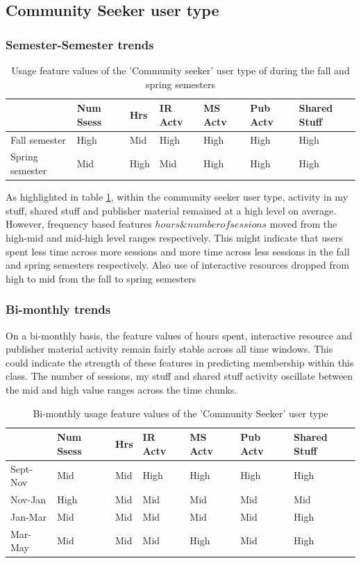 \documentclass{acm_proc_article-sp}
\begin{document}
\subsection{Community Seeker user type}

\subsubsection{Semester-Semester trends}

\begin{table}
\caption{Usage feature values of the 'Community seeker' user type of during the fall and  spring semesters}
\label{cluster2month}
\begin{tabular}{|p{1.5cm}|p{0.6cm}|p{0.6cm}|p{0.6cm}|p{0.6cm}|p{0.8cm}|p{0.8cm}|}
 & Num Ssess & Hrs & IR Actv & MS Actv & Pub Actv & Shared Stuff \\ \hline
Fall  semester & High & Mid  & High & High & High & High \\ \hline
Spring semester & Mid & High  & Mid & High & High & High \\ \hline
\end{tabular}
\end{table}

As highlighted in table \ref{cluster2month}, within the community seeker user type, activity in my stuff, shared stuff and publisher material remained at a high level on average. However, frequency based features \(hours \& number of sessions\) moved from the high-mid and mid-high level ranges respectively. This might indicate that users  spent less time across more sessions and more time across less sessions in the fall and spring semesters respectively. Also use of interactive resources dropped from high to mid from the fall to spring semesters

\subsubsection{Bi-monthly trends}
On a bi-monthly basis, the feature values of hours spent, interactive resource and publisher material activity remain fairly stable across all time windows. This could indicate the strength of these features in predicting membership within this class. The number of sessions, my stuff and shared stuff activity oscillate between the mid and high value ranges across the time chunks.  
\begin{table}
\caption{Bi-monthly usage feature values of the 'Community Seeker' user type}
\label{cluster1bimonthly}
\begin{tabular}{|p{1.5cm}|p{0.6cm}|p{0.6cm}|p{0.6cm}|p{0.6cm}|p{0.8cm}|p{0.8cm}|}
 & Num Ssess & Hrs & IR Actv & MS Actv & Pub Actv & Shared Stuff \\ \hline
Sept-Nov & Mid & Mid  & High & High & High & High \\ \hline
Nov-Jan & High & Mid  & Mid & Mid & Mid & Mid \\ \hline
Jan-Mar & Mid & Mid  & Mid & Mid & Mid & High \\ \hline
Mar-May & Mid & Mid  & Mid & High & Mid & High \\ \hline
\end{tabular}
\end{table}
\end{document}
